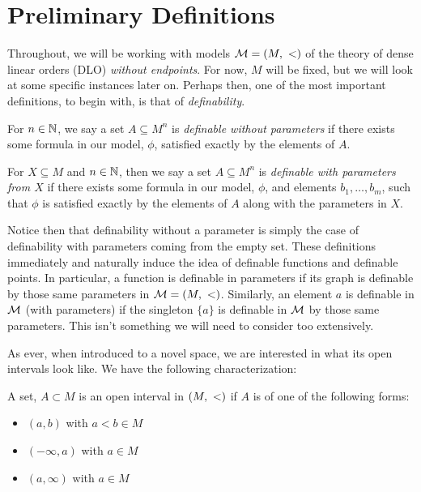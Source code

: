 \section{Preliminary Definitions}
\label{sec:prelim-defns}
Throughout, we will be working with models $ \mathcal{M} = (M, \ <)$ of the theory of dense linear orders (DLO) \emph{without endpoints}. For now, $M$ will be fixed, but we will look at some specific instances later on. Perhaps then, one of the most important definitions, to begin with, is that of \emph{definability}.

\begin{definition}
For $n \in \mathbb{N}$, we say a set $A \subseteq M^n$ is \emph{definable without parameters} if there exists some formula in our model, $ \phi$, satisfied exactly by the elements of $A$.
\end{definition}

\begin{definition}
For $X \subseteq M$ and $n \in \mathbb{N}$, then we say a set $A \subseteq M^n$ is \emph{definable with parameters from $X$} if there exists some formula in our model, $ \phi$, and elements $b_1, \hdots, b_m$, such that $ \phi$ is satisfied exactly by the elements of $A$ along with the parameters in $X$.
\end{definition}

Notice then that definability without a parameter is simply the case of definability with parameters coming from the empty set. These definitions immediately and naturally induce the idea of definable functions and definable points. In particular, a function is definable in parameters if its graph is definable by those same parameters in $\mathcal{M} = (M, \ <)$. Similarly, an element $a$ is definable in $\mathcal{M}$ (with parameters) if the singleton $\{a\}$ is definable in $ \mathcal{M}$ by those same parameters. This isn't something we will need to consider too extensively.

As ever, when introduced to a novel space, we are interested in what its open intervals look like. We have the following characterization:

\begin{definition}
  A set, $A \subset M$ is an open interval in $(M, \ <)$ if $A$ is of one of the following forms:
  \begin{itemize}
    \item $(a, b)$ with $a < b \in M$
    \item $(- \infty, a)$ with $a \in M$
    \item $(a, \infty)$ with $a \in M$
  \end{itemize}
\end{definition}

